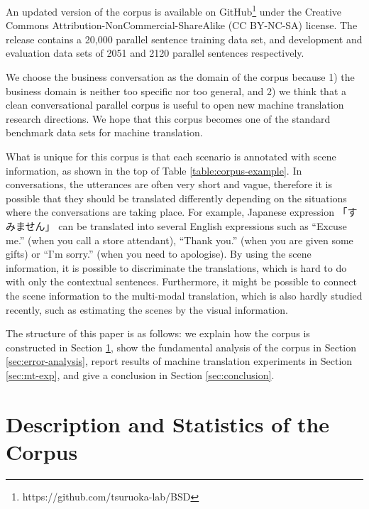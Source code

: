 \documentclass[11pt,a4paper]{article}
\begin{document}
An updated version of the corpus is available on GitHub\footnote{https://github.com/tsuruoka-lab/BSD} under the Creative Commons Attribution-NonCommercial-ShareAlike (CC BY-NC-SA) license. The release contains a 20,000 parallel sentence training data set, and development and evaluation data sets of 2051 and 2120 parallel sentences respectively.

We choose the business conversation as the domain of the corpus because 1) the business domain is neither too specific nor too general, and 2) we think that a clean conversational parallel corpus is useful to open new machine translation research directions. We hope that this corpus becomes one of the standard benchmark data sets for machine translation. 

\begin{CJK}{UTF8}{min}
What is unique for this corpus is that each scenario is annotated with scene information, as shown in the top of Table \ref{table:corpus-example}. In conversations, the utterances are often very short and vague, therefore it is possible that they should be translated differently depending on the situations where the conversations are taking place. For example, Japanese expression 「すみません」 can be translated into several English expressions such as ``Excuse me.'' (when you call a store attendant), ``Thank you.'' (when you are given some gifts) or ``I'm sorry.'' (when you need to apologise). By using the scene information, it is possible to discriminate the translations, which is hard to do with only the contextual sentences. Furthermore, it might be possible to connect the scene information to the multi-modal translation, which is also hardly studied recently, such as estimating the scenes by the visual information.
\end{CJK}

The structure of this paper is as follows: we explain how the corpus is constructed in Section \ref{sec:statistics}, show the fundamental analysis of the corpus in Section \ref{sec:error-analysis}, report results of machine translation experiments in Section \ref{sec:mt-exp}, and give a conclusion in Section \ref{sec:conclusion}.


\section{Description and Statistics of the Corpus}
\label{sec:statistics}
\end{document}
